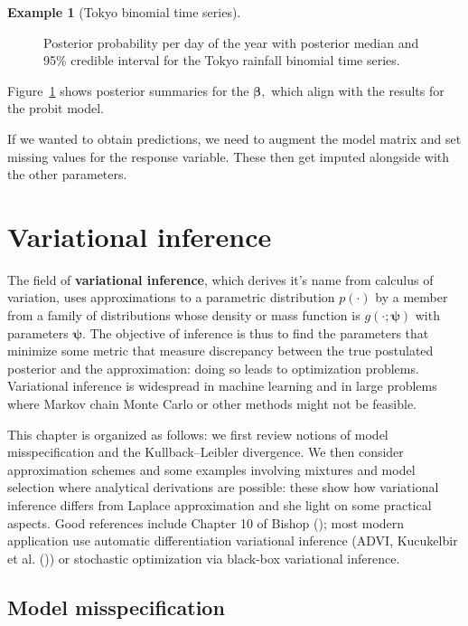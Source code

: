 \documentclass[
  11pt,
  letterpaper,
]{scrbook}
\theoremstyle{plain}
\theoremstyle{definition}
\theoremstyle{definition}
\newtheorem{example}{Example}[chapter]
\theoremstyle{plain}
\theoremstyle{plain}
\theoremstyle{definition}
\theoremstyle{remark}
\begin{document}
\begin{example}[Tokyo binomial time
series]
\begin{figure}[ht!]
{}

\caption{\label{fig-rainfall-inla}Posterior probability per day of the
year with posterior median and 95\% credible interval for the Tokyo
rainfall binomial time series.}

\end{figure}%

Figure~\ref{fig-rainfall-inla} shows posterior summaries for the
\(\boldsymbol{\beta},\) which align with the results for the probit
model.

If we wanted to obtain predictions, we need to augment the model matrix
and set missing values for the response variable. These then get imputed
alongside with the other parameters.

\end{example}


\chapter{Variational inference}\label{variational-inference}

The field of \textbf{variational inference}, which derives it's name
from calculus of variation, uses approximations to a parametric
distribution \(p(\cdot)\) by a member from a family of distributions
whose density or mass function is \(g(\cdot; \boldsymbol{\psi})\) with
parameters \(\boldsymbol{\psi}.\) The objective of inference is thus to
find the parameters that minimize some metric that measure discrepancy
between the true postulated posterior and the approximation: doing so
leads to optimization problems. Variational inference is widespread in
machine learning and in large problems where Markov chain Monte Carlo or
other methods might not be feasible.

This chapter is organized as follows: we first review notions of model
misspecification and the Kullback--Leibler divergence. We then consider
approximation schemes and some examples involving mixtures and model
selection where analytical derivations are possible: these show how
variational inference differs from Laplace approximation and she light
on some practical aspects. Good references include Chapter 10 of Bishop
(); most modern application use
automatic differentiation variational inference (ADVI, Kucukelbir et al.
()) or stochastic optimization via
black-box variational inference.

\section{Model misspecification}\label{model-misspecification}
\end{document}
